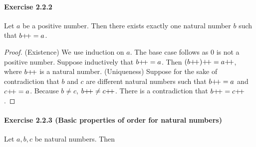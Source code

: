 \paragraph{Exercise 2.2.2} Let $a$ be a positive number. Then there exists exactly one natural number $b$ such that $b{+}{\mkern-4mu}{+} = a$.
\begin{proof}
    (Existence) We use induction on $a$. The base case follows as $0$ is not a positive number. Suppose inductively that $b{+}{\mkern-4mu}{+} = a$. Then $(b{+}{\mkern-4mu}{+}){+}{\mkern-4mu}{+} = a{+}{\mkern-4mu}{+}$, where $b{+}{\mkern-4mu}{+}$ is a natural number.
    (Uniqueness) Suppose for the sake of contradiction that $b$ and $c$ are different natural numbers such that $b{+}{\mkern-4mu}{+} = a$ and $c{+}{\mkern-4mu}{+} =a$. Because $b \neq c$, $b{+}{\mkern-4mu}{+} \neq c{+}{\mkern-4mu}{+}$. There is a contradiction that $b{+}{\mkern-4mu}{+} = c{+}{\mkern-4mu}{+}$.
\end{proof}

\paragraph{Exercise 2.2.3 (Basic properties of order for natural numbers)} Let $a, b, c$ be natural numbers. Then
